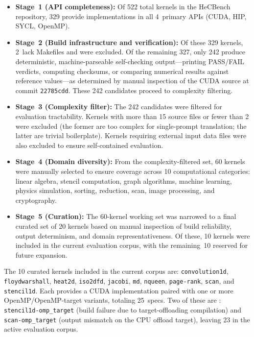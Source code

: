 \begin{itemize}
    \item \textbf{Stage~1 (API completeness):} Of 522 total kernels in the HeCBench repository, 329 provide implementations in all 4~primary APIs (CUDA, HIP, SYCL, OpenMP).
    \item \textbf{Stage~2 (Build infrastructure and verification):} Of these 329 kernels, 2~lack Makefiles and were excluded. Of the remaining 327, only 242 produce deterministic, machine-parseable self-checking output---printing PASS/FAIL verdicts, computing checksums, or comparing numerical results against reference values---as determined by manual inspection of the CUDA source at commit \texttt{22785cdd}. These 242 candidates proceed to complexity filtering.
    \item \textbf{Stage~3 (Complexity filter):} The 242 candidates were filtered for evaluation tractability. Kernels with more than 15 source files or fewer than 2 were excluded (the former are too complex for single-prompt translation; the latter are trivial boilerplate). Kernels requiring external input data files were also excluded to ensure self-contained evaluation.
    \item \textbf{Stage~4 (Domain diversity):} From the complexity-filtered set, 60 kernels were manually selected to ensure coverage across 10 computational categories: linear algebra, stencil computation, graph algorithms, machine learning, physics simulation, sorting, reduction, scan, image processing, and cryptography.
    \item \textbf{Stage~5 (Curation):} The 60-kernel working set was narrowed to a final curated set of 20 kernels based on manual inspection of build reliability, output determinism, and domain representativeness. Of these, 10 kernels were included in the current \parbench{} evaluation corpus, with the remaining~10 reserved for future expansion.
\end{itemize}

The 10 curated kernels included in the current corpus are: \texttt{convolution1d}, \texttt{floydwarshall}, \texttt{heat2d}, \texttt{iso2dfd}, \texttt{jacobi}, \texttt{md}, \texttt{nqueen}, \texttt{page-rank}, \texttt{scan}, and \texttt{stencil1d}. Each provides a CUDA implementation paired with one or more OpenMP/OpenMP-target variants, totaling 25~specs. Two of these are \knownfail{}: \texttt{stencil1d-omp\_target} (build failure due to target-offloading compilation) and \texttt{scan-omp\_target} (output mismatch on the CPU offload target), leaving 23 in the active evaluation corpus.

